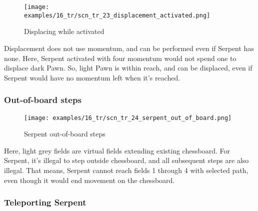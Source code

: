 \noindent
\begin{wrapfigure}[11]{l}{0.4\textwidth}
\centering
\texttt{[image: examples/16\_tr/scn\_tr\_23\_displacement\_activated.png]}
\vspace*{-0.5\baselineskip}
\caption{Displacing while activated}
\label{fig:scn_tr_23_displacement_activated}
\end{wrapfigure}
Displacement does not use momentum, and can be performed even if Serpent has none.\newline
\indent
Here, Serpent activated with four momentum would not spend one to displace dark
Pawn. So, light Pawn is within reach, and can be displaced, even if Serpent would
have no momentum left when it's reached.

\clearpage %

\subsubsection*{Out-of-board steps}
\label{sec:Tamoanchan Revisited/Serpent/Movement/Out-of-board steps}

\vspace*{-1.0\baselineskip}
\noindent
\begin{figure}[!h]
\texttt{[image: examples/16\_tr/scn\_tr\_24\_serpent\_out\_of\_board.png]}
\caption{Serpent out-of-board steps}
\label{fig:scn_tr_24_serpent_out_of_board}
\end{figure}

Here, light grey fields are virtual fields extending existing chessboard.
For Serpent, it's illegal to step outside chessboard, and all subsequent
steps are also illegal. That means, Serpent cannot reach fields 1 through
4 with selected path, even though it would end movement on the chessboard.

\clearpage %

\subsubsection*{Teleporting Serpent}
\label{sec:Tamoanchan Revisited/Serpent/Movement/Teleporting Serpent}

